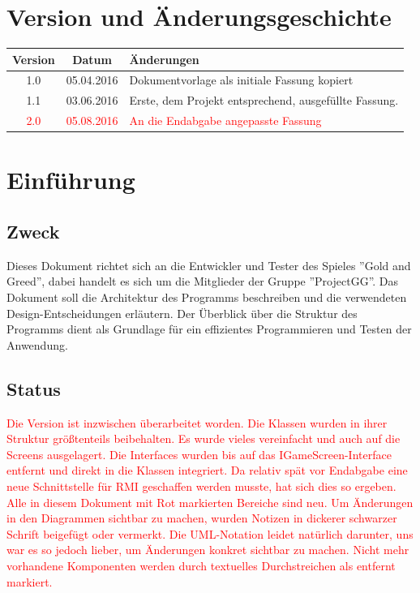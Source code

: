 \documentclass[fontsize=12pt,paper=a4,twoside]{scrartcl}
\begin{document}
\newpage



\section*{Version und Änderungsgeschichte}

\begin{tabular}{ccl}
Version & Datum & Änderungen \\
\hline
1.0 & 05.04.2016 & Dokumentvorlage als initiale Fassung kopiert \\
1.1 & 03.06.2016 & Erste, dem Projekt entsprechend, ausgefüllte Fassung. \\
\textcolor{red}{2.0} &\textcolor{red}{ 05.08.2016} &\textcolor{red}{ An die Endabgabe angepasste Fassung}
\end{tabular}


\section{Einführung}

\subsection{Zweck}

Dieses Dokument richtet sich an die Entwickler und Tester des Spieles ''Gold and Greed'', dabei handelt es sich um die Mitglieder der Gruppe ''ProjectGG''. Das Dokument soll die Architektur des Programms beschreiben und die verwendeten Design-Entscheidungen erläutern. Der Überblick über die Struktur des Programms dient als Grundlage für ein effizientes Programmieren und Testen der Anwendung.

\subsection{Status}

\textcolor{red}{Die Version ist inzwischen überarbeitet worden. Die Klassen wurden in ihrer Struktur größtenteils beibehalten.
Es wurde vieles vereinfacht und auch auf die Screens ausgelagert. Die Interfaces wurden bis auf das IGameScreen-Interface entfernt und direkt in die Klassen integriert. Da relativ spät vor Endabgabe eine neue Schnittstelle für RMI geschaffen werden musste, hat sich dies so ergeben. Alle in diesem Dokument mit Rot markierten Bereiche sind neu. Um Änderungen in den Diagrammen sichtbar zu machen, wurden Notizen in dickerer schwarzer Schrift beigefügt oder vermerkt. Die UML-Notation leidet natürlich darunter, uns war es so jedoch lieber, um Änderungen konkret sichtbar zu machen. Nicht mehr vorhandene Komponenten werden durch textuelles Durchstreichen als entfernt markiert.}
\end{document}
